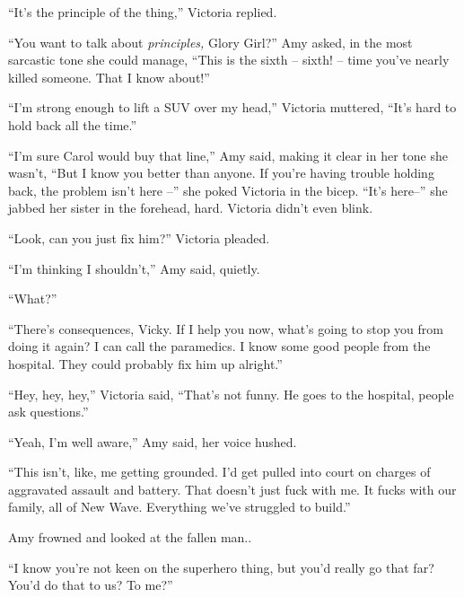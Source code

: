 ``It's the principle of the thing,'' Victoria replied.



``You want to talk about \emph{principles, }Glory Girl?'' Amy asked, in the most sarcastic tone she could manage, ``This is the sixth – sixth! – time you've nearly killed someone.  That I know about!''



``I'm strong enough to lift a SUV over my head,'' Victoria muttered, ``It's hard to hold back all the time.''



``I'm sure Carol would buy that line,'' Amy said, making it clear in her tone she wasn't, ``But I know you better than anyone.  If you're having trouble holding back, the problem isn't here --'' she poked Victoria in the bicep.  ``It's here--'' she jabbed her sister in the forehead, hard.  Victoria didn't even blink.



``Look, can you just fix him?'' Victoria pleaded.



``I'm thinking I shouldn't,'' Amy said, quietly.



``What?''



``There's consequences, Vicky.  If I help you now, what's going to stop you from doing it again?  I can call the paramedics.  I know some good people from the hospital.  They could probably fix him up alright.''



``Hey, hey, hey,'' Victoria said, ``That's not funny.  He goes to the hospital, people ask questions.''



``Yeah, I'm well aware,'' Amy said, her voice hushed.



``This isn't, like, me getting grounded.  I'd get pulled into court on charges of aggravated assault and battery.  That doesn't just fuck with me.  It fucks with our family, all of New Wave.  Everything we've struggled to build.''



Amy frowned and looked at the fallen man..



``I know you're not keen on the superhero thing, but you'd really go that far?  You'd do that to us?  To me?''



